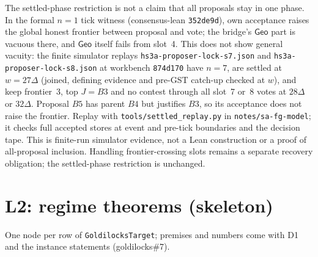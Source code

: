\documentclass{article}
\begin{document}
The settled-phase restriction is not a claim that all proposals stay in one
phase.  In the formal $n=1$ tick witness (consensus-lean \texttt{352de9d}),
own acceptance raises the global honest frontier between proposal and vote;
the bridge's $\mathsf{Geo}$ part is vacuous there, and $\mathsf{Geo}$ itself
fails from slot~4.  This does not show general vacuity: the finite simulator
replays \texttt{hs3a-proposer-lock-s7.json} and \texttt{hs3a-proposer-lock-s8.json} at workbench
\texttt{874d170} have $n=7$, are settled at $w=27\Delta$ (joined, defining
evidence and pre-GST catch-up checked at $w$), and keep frontier~3, top
$J=B3$ and no contest through all slot~7 or~8 votes at $28\Delta$ or
$32\Delta$.  Proposal $B5$ has parent $B4$ but justifies $B3$, so its
acceptance does not raise the frontier.  Replay with
\texttt{tools/settled\_replay.py} in \texttt{notes/sa-fg-model}; it checks
full accepted stores at event and pre-tick boundaries and the decision tape.
This is finite-run simulator evidence, not a Lean construction or a proof
of all-proposal inclusion.  Handling frontier-crossing slots remains a
separate recovery obligation; the settled-phase restriction is unchanged.

\section{L2: regime theorems (skeleton)}\label{sec:l2}

One node per row of \texttt{GoldilocksTarget}; premises and numbers come with
D1 and the instance statements (goldilocks\#7).
\end{document}
